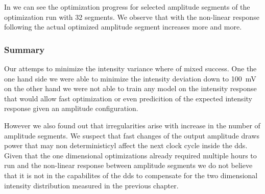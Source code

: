 In  we can see the optimization
progress for selected amplitude segments of the optimization run with 32
segments. We observe that with the non-linear response following the actual
optimized amplitude segment increases more and more.

\subsubsection{Summary}

Our attemps to minimize the intensity variance where of mixed success. One
the one hand side we were able to minimize the intensity deviation down
to \SI{100}{\milli\volt} on the other hand we were not able to train any
model on the intensity response that would allow fast optimization or even
predicition of the expected intensity response given an amplitude
configuration.

However we also found out that irregularities arise with increase in the
number of amplitude segments. We suspect that fast changes of the output
amplitude draws power that may non deterministicyl affect the next clock
cycle inside the \gls{dds}. Given that the one dimensional optimizations
already required multiple hours to run and the non-linear response between
amplitude segments we do not believe that it is not in the capabilites of the
\gls{dds} to compensate for the two dimensional intensity distribution
measured in the previous chapter.
